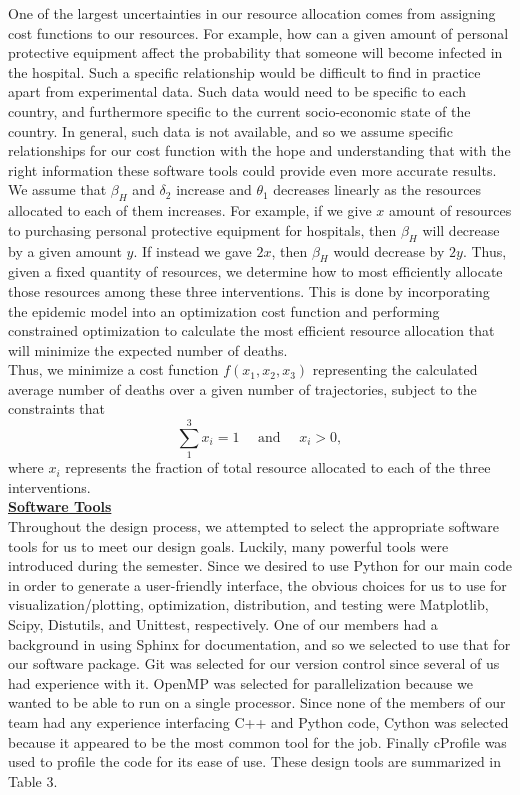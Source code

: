 \documentclass[11pt,letter]{article}
\begin{document}
One of the largest uncertainties in our resource allocation comes from assigning cost functions to our resources. For example, how can a given amount of personal protective equipment affect the probability that someone will become infected in the hospital. Such a specific relationship would be difficult to find in practice apart from experimental data. Such data would need to be specific to each country, and furthermore specific to the current socio-economic state of the country. In general, such data is not available, and so we assume specific relationships for our cost function with the hope and understanding that with the right information these software tools could provide even more accurate results. We assume that $\beta_H$ and $\delta_2$ increase and $\theta_1$ decreases linearly as the resources allocated to each of them increases. For example, if we give $x$ amount of resources to purchasing personal protective equipment for hospitals, then $\beta_H$ will decrease by a given amount $y$. If instead we gave $2x$, then $\beta_H$ would decrease by $2y$. Thus, given a fixed quantity of resources, we determine how to most efficiently allocate those resources among these three interventions. This is done by incorporating the epidemic model into an optimization cost function and performing constrained optimization to calculate the most efficient resource allocation that will minimize the expected number of deaths.\\

Thus, we minimize a cost function $f(x_1,x_2,x_3)$ representing the calculated average number of deaths over a given number of trajectories, subject to the constraints that 
\begin{equation}
\sum\limits_{1}^{3}x_i=1\text{~~~~and~~~~}x_i>0,
\end{equation} 
where $x_i$ represents the fraction of total resource allocated to each of the three interventions. \\

\underline{\textbf{Software Tools}}\vspace{-0.5mm}\\
Throughout the design process, we attempted to select the appropriate software tools for us to meet our design goals. Luckily, many powerful tools were introduced during the semester. Since we desired to use Python for our main code in order to generate a user-friendly interface, the obvious choices for us to use for visualization/plotting, optimization, distribution, and testing were Matplotlib, Scipy, Distutils, and Unittest, respectively. One of our members had a background in using Sphinx for documentation, and so we selected to use that for our software package. Git was selected for our version control since several of us had experience with it. OpenMP was selected for parallelization because we wanted to be able to run on a single processor. Since none of the members of our team had any experience interfacing C++ and Python code, Cython was selected because it appeared to be the most common tool for the job. Finally cProfile was used to profile the code for its ease of use. These design tools are summarized in Table 3.\\
\end{document}
